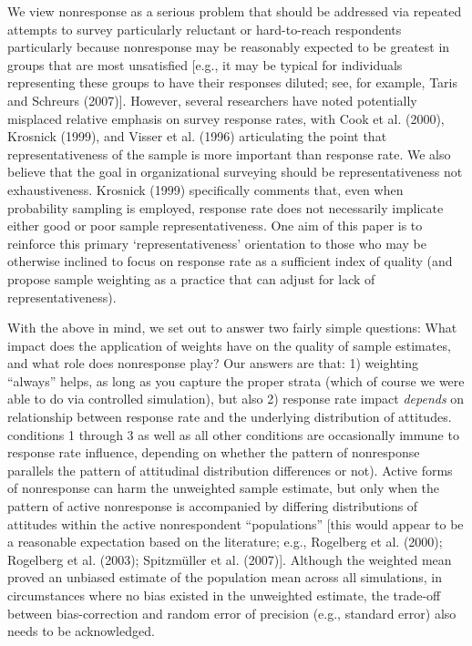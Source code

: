 \documentclass[
  man,mask]{apa7}
\begin{document}
We view nonresponse as a serious problem that should be addressed via repeated attempts to survey particularly reluctant or hard-to-reach respondents particularly because nonresponse may be reasonably expected to be greatest in groups that are most unsatisfied {[}e.g., it may be typical for individuals representing these groups to have their responses diluted; see, for example, Taris and Schreurs (2007){]}. However, several researchers have noted potentially misplaced relative emphasis on survey response rates, with Cook et al. (2000), Krosnick (1999), and Visser et al. (1996) articulating the point that representativeness of the sample is more important than response rate. We also believe that the goal in organizational surveying should be representativeness not exhaustiveness. Krosnick (1999) specifically comments that, even when probability sampling is employed, response rate does not necessarily implicate either good or poor sample representativeness. One aim of this paper is to reinforce this primary `representativeness' orientation to those who may be otherwise inclined to focus on response rate as a sufficient index of quality (and propose sample weighting as a practice that can adjust for lack of representativeness).

With the above in mind, we set out to answer two fairly simple questions: What impact does the application of weights have on the quality of sample estimates, and what role does nonresponse play? Our answers are that: 1) weighting ``always'' helps, as long as you capture the proper strata (which of course we were able to do via controlled simulation), but also 2) response rate impact \emph{depends} on relationship between response rate and the underlying distribution of attitudes. conditions 1 through 3 as well as all other conditions are occasionally immune to response rate influence, depending on whether the pattern of nonresponse parallels the pattern of attitudinal distribution differences or not). Active forms of nonresponse can harm the unweighted sample estimate, but only when the pattern of active nonresponse is accompanied by differing distributions of attitudes within the active nonrespondent ``populations'' {[}this would appear to be a reasonable expectation based on the literature; e.g., Rogelberg et al. (2000); Rogelberg et al. (2003); Spitzmüller et al. (2007){]}. Although the weighted mean proved an unbiased estimate of the population mean across all simulations, in circumstances where no bias existed in the unweighted estimate, the trade-off between bias-correction and random error of precision (e.g., standard error) also needs to be acknowledged.
\end{document}
